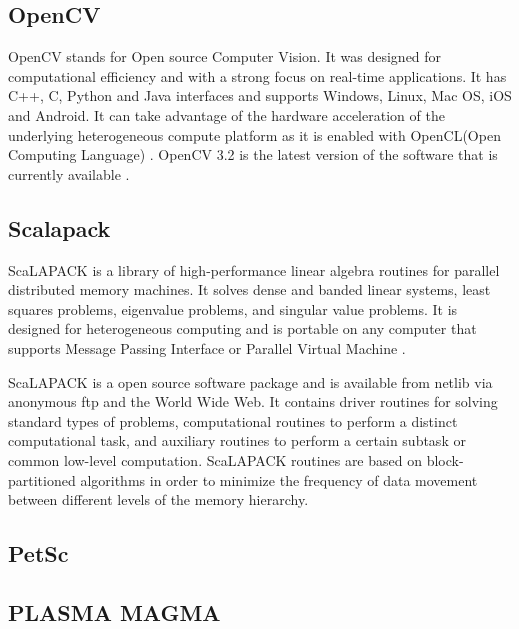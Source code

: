 \subsection{OpenCV}

    OpenCV stands for Open source Computer Vision. It was designed for
    computational efficiency and with a strong focus on real-time
    applications. It has C++, C, Python and Java interfaces and
    supports Windows, Linux, Mac OS, iOS and Android. It can take
    advantage of the hardware acceleration of the underlying
    heterogeneous compute platform as it is enabled with OpenCL(Open
    Computing Language) \cite{www-opencv}. OpenCV 3.2 is the latest
    version of the software that is currently available
    \cite{opencv-version}.

\subsection{Scalapack}

    ScaLAPACK is a library of high-performance linear algebra routines for
    parallel distributed memory machines. It solves dense and banded
    linear systems, least squares problems, eigenvalue problems, and
    singular value problems. It is designed for heterogeneous computing
    and is portable on any computer that supports Message Passing
    Interface or Parallel Virtual Machine \cite{www-scalapack}.

    ScaLAPACK is a open source software package and is available from
    netlib via anonymous ftp and the World Wide Web. It contains driver
    routines for solving standard types of problems, computational
    routines to perform a distinct computational task, and auxiliary
    routines to perform a certain subtask or common low-level
    computation. ScaLAPACK routines are based on block-partitioned
    algorithms in order to minimize the frequency of data movement between
    different levels of the memory hierarchy.
    
\subsection{PetSc}
\subsection{PLASMA MAGMA}


